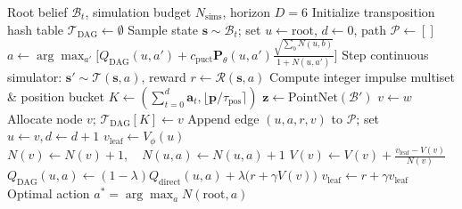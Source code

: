 \documentclass[conference]{IEEEtran}
\begin{document}
\begin{algorithm}[!t]
\caption{Latent Belief-Graph POMCP (DAG-MCTS)}
\label{alg:dag_mcts}
\begin{algorithmic}[1]
\REQUIRE Root belief $\mathcal{B}_t$, simulation budget $N_{\text{sims}}$, horizon $D=6$
\STATE Initialize transposition hash table $\mathcal{T}_{\text{DAG}} \leftarrow \emptyset$
    \STATE Sample state $\mathbf{s} \sim \mathcal{B}_t$; set $u \leftarrow \text{root}$, $d \leftarrow 0$, path $\mathcal{P} \leftarrow []$
        \STATE {}
        \STATE $a \leftarrow \arg\max_{a'} \big[ Q_{\text{DAG}}(u, a') + c_{\text{puct}} \mathbf{P}_\theta(u, a') \frac{\sqrt{\sum_b N(u, b)}}{1 + N(u, a')} \big]$
        \STATE Step continuous simulator: $\mathbf{s}' \sim \mathcal{T}(\mathbf{s}, a)$, reward $r \leftarrow \mathcal{R}(\mathbf{s}, a)$
        \STATE {}
        \STATE Compute integer impulse multiset \& position bucket $K \leftarrow (\sum_{t=0}^d \mathbf{a}_t, \lfloor \mathbf{p} / \tau_{\text{pos}} \rceil)$
        \STATE $\mathbf{z} \leftarrow \text{PointNet}(\mathcal{B}')$ 
            \STATE $v \leftarrow w$ 
        \ELSE
            \STATE Allocate node $v$; $\mathcal{T}_{\text{DAG}}[K] \leftarrow v$
        \ENDIF
        \STATE Append edge $(u, a, r, v)$ to $\mathcal{P}$; set $u \leftarrow v, d \leftarrow d + 1$
    \ENDWHILE
    \STATE {}
    \STATE $v_{\text{leaf}} \leftarrow V_\phi(u)$
    \STATE {}
        \STATE $N(v) \leftarrow N(v) + 1, \quad N(u, a) \leftarrow N(u, a) + 1$
        \STATE $V(v) \leftarrow V(v) + \frac{v_{\text{leaf}} - V(v)}{N(v)}$
        \STATE $Q_{\text{DAG}}(u, a) \leftarrow (1 - \lambda) Q_{\text{direct}}(u, a) + \lambda \big(r + \gamma V(v)\big)$
        \STATE $v_{\text{leaf}} \leftarrow r + \gamma v_{\text{leaf}}$
    \ENDFOR
\ENDFOR
\RETURN Optimal action $a^* = \arg\max_a N(\text{root}, a)$
\end{algorithmic}
\end{algorithm}
\end{document}

